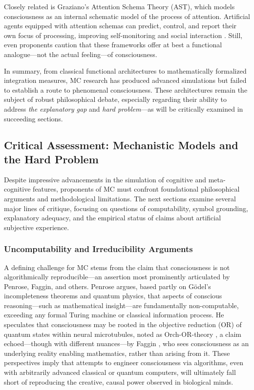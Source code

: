 Closely related is Graziano's Attention Schema Theory (AST), which models consciousness as an internal schematic model of the process of attention. Artificial agents equipped with attention schemas can predict, control, and report their own focus of processing, improving self-monitoring and social interaction \cite{graziano2022framework}. Still, even proponents caution that these frameworks offer at best a functional analogue---not the actual feeling---of consciousness.

In summary, from classical functional architectures to mathematically formalized integration measures, MC research has produced advanced simulations but failed to establish a route to phenomenal consciousness. These architectures remain the subject of robust philosophical debate, especially regarding their ability to address \emph{the explanatory gap} and \emph{hard problem}---as will be critically examined in succeeding sections.

\subsection{Critical Assessment: Mechanistic Models and the Hard Problem}
\label{subsec:critical_mechanistic_assessment}

Despite impressive advancements in the simulation of cognitive and meta-cognitive features, proponents of MC must confront foundational philosophical arguments and methodological limitations. The next sections examine several major lines of critique, focusing on questions of computability, symbol grounding, explanatory adequacy, and the empirical status of claims about artificial subjective experience.

\subsubsection{Uncomputability and Irreducibility Arguments}

A defining challenge for MC stems from the claim that consciousness is not algorithmically reproducible---an assertion most prominently articulated by Penrose, Faggin, and others. Penrose \cite{penrose1990emperors} argues, based partly on Gödel's incompleteness theorems and quantum physics, that aspects of conscious reasoning---such as mathematical insight---are fundamentally non-computable, exceeding any formal Turing machine or classical information process. He speculates that consciousness may be rooted in the objective reduction (OR) of quantum states within neural microtubules, noted as Orch-OR-theory \cite{hameroff2014consciousness}, a claim echoed---though with different nuances---by Faggin \cite{faggin2024irreducible}, who sees consciousness as an underlying reality enabling mathematics, rather than arising from it. These perspectives imply that attempts to engineer consciousness via algorithms, even with arbitrarily advanced classical or quantum computers, will ultimately fall short of reproducing the creative, causal power observed in biological minds.

